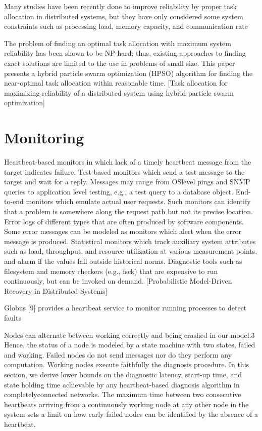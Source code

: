 \documentclass{cslthse-msc}
\begin{document}
\cite{schedReplicas}

Many studies have been recently done to improve reliability by proper task allocation in distributed systems, but they have only considered some system constraints such as processing load, memory capacity, and communication rate \cite{optTaskAllocationForMaxRel}

The problem of finding an optimal task allocation with maximum system reliability has been shown to be NP-hard; thus, existing approaches to finding exact solutions are limited to the use in problems of small size. This paper presents a hybrid particle swarm optimization (HPSO) algorithm for finding the near-optimal task allocation within reasonable time. [Task allocation for maximizing reliability of a distributed system using hybrid particle swarm optimization]

\section{Monitoring}
Heartbeat-based monitors in which lack of a timely heartbeat message from the target indicates failure.
Test-based monitors which send a test message to the target and wait for a reply. Messages may range from OSlevel pings and SNMP queries to application level testing, e.g., a test query to a database object.
End-to-end monitors which emulate actual user requests. Such monitors can identify that a problem is somewhere along the request path but not its precise location.
Error logs of different types that are often produced by software components. Some error messages can be modeled as monitors which alert when the error message is produced.
Statistical monitors which track auxiliary system attributes such as load, throughput, and resource utilization at various measurement points, and alarm if the values fall outside historical norms.
Diagnostic tools such as filesystem and memory checkers (e.g., fsck) that are expensive to run continuously, but can be invoked on demand. [Probabilistic Model-Driven Recovery in Distributed Systems]


Globus [9] provides a heartbeat service to monitor running processes to detect faults  \cite{effTaskReplMobGrid}

Nodes can alternate between working correctly and being crashed in our model.3 Hence, the status of a node is modeled by a state machine with two states, failed and working. Failed nodes do not send messages nor do they perform any computation. Working nodes execute faithfully the diagnosis procedure. In this section, we derive lower bounds on the diagnostic
latency, start-up time, and state holding time achievable by any heartbeat-based diagnosis algorithm in completelyconnected networks. The maximum time between two consecutive heartbeats arriving from a continuously working node at any other node in the system sets a limit on how early failed nodes can be identified by the absence of a heartbeat. \cite{distDiagnosis}
\end{document}
